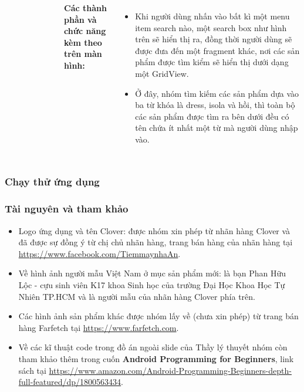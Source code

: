 \documentclass{beamer}
\begin{document}
\begin{frame}
\begin{columns}
\begin{figure}
        \end{figure}
        \indent \textbf{Các thành phần và chức năng kèm theo trên màn hình:}
        \begin{itemize}
            \item Khi người dùng nhấn vào bất kì một menu item search nào, một search box như hình trên sẽ hiển thị ra, đồng thời người dùng sẽ được đưa đến một fragment khác, nơi các sản phẩm được tìm kiểm sẽ hiển thị dưới dạng một GridView.
            \item Ở đây, nhóm tìm kiếm các sản phẩm dựa vào ba từ khóa là \textsf{\color{teal} dress}, \textsf{\color{teal} isola} và \textsf{\color{teal} hồi}, thì toàn bộ các sản phẩm được tìm ra bên dưới đều có tên chứa ít nhất một từ mà người dùng nhập vào.
        \end{itemize}
    \end{columns}
\end{frame}

\begin{frame}
    \frametitle{Chạy thử ứng dụng}
\end{frame}

\begin{frame}
    \frametitle{Tài nguyên và tham khảo}
    \begin{itemize}
        \item Logo ứng dụng và tên Clover: được nhóm xin phép từ nhãn hàng Clover và đã được sự đồng ý từ chị chủ nhãn hàng, trang bán hàng của nhãn hàng tại \href{https://www.facebook.com/TiemmaynhaAn}{\color{blue} https://www.facebook.com/TiemmaynhaAn}.
        \item Về hình ảnh người mẫu Việt Nam ở mục sản phẩm mới: là bạn Phan Hữu Lộc - cựu sinh viên K17 khoa Sinh học của trường Đại Học Khoa Học Tự Nhiên TP.HCM và là người mẫu của nhãn hàng Clover phía trên.
        \item Các hình ảnh sản phẩm khác được nhóm lấy về (chưa xin phép) từ trang bán hàng Farfetch tại \href{https://www.farfetch.com}{\color{blue} https://www.farfetch.com}.
        \item Về các kĩ thuật code trong đồ án ngoài slide của Thầy lý thuyết nhóm còn tham khảo thêm trong cuốn \textbf{\color{teal} Android Programming for Beginners}, link sách tại \href{https://www.amazon.com/Android-Programming-Beginners-depth-full-featured/dp/1800563434}{\color{blue} https://www.amazon.com/Android-Programming-Beginners-depth-full-featured/dp/1800563434}.
    \end{itemize}
\end{frame}
\end{document}
